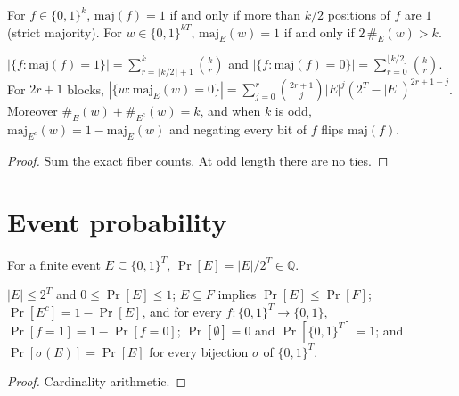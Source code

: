 \begin{definition}[Majority]
  \label{def:encodings-majority}
  \leanok
  For $f \in \{0,1\}^k$, $\mathrm{maj}(f) = 1$ if and only if more than $k/2$
  positions of $f$ are $1$ (strict majority). For $w \in \{0,1\}^{kT}$,
  $\mathrm{maj}_E(w) = 1$ if and only if $2\,\#_E(w) > k$.
\end{definition}

\begin{lemma}
  \label{lem:encodings-majority-count}
  \leanok
  $|\{f : \mathrm{maj}(f) = 1\}| = \sum_{r = \lfloor k/2 \rfloor + 1}^{k} \binom{k}{r}$
  and $|\{f : \mathrm{maj}(f) = 0\}| = \sum_{r=0}^{\lfloor k/2 \rfloor} \binom{k}{r}$.
  For $2r + 1$ blocks,
  $|\{w : \mathrm{maj}_E(w) = 0\}| = \sum_{j=0}^{r} \binom{2r+1}{j} |E|^j (2^T - |E|)^{2r+1-j}$.
  Moreover $\#_E(w) + \#_{E^c}(w) = k$, and when $k$ is odd,
  $\mathrm{maj}_{E^c}(w) = 1 - \mathrm{maj}_E(w)$ and negating every bit of
  $f$ flips $\mathrm{maj}(f)$.
\end{lemma}
\begin{proof}
  \leanok
  Sum the exact fiber counts. At odd length there are no ties.
\end{proof}

\section{Event probability}

\begin{definition}
  \label{def:encodings-eventprob}
  \leanok
  For a finite event $E \subseteq \{0,1\}^T$,
  $\Pr[E] = |E| / 2^T \in \mathbb{Q}$.
\end{definition}

\begin{lemma}
  \label{lem:encodings-eventprob-basic}
  \leanok
  $|E| \le 2^T$ and $0 \le \Pr[E] \le 1$; $E \subseteq F$ implies
  $\Pr[E] \le \Pr[F]$; $\Pr[E^c] = 1 - \Pr[E]$, and for every
  $f : \{0,1\}^T \to \{0,1\}$, $\Pr[f = 1] = 1 - \Pr[f = 0]$;
  $\Pr[\emptyset] = 0$ and $\Pr[\{0,1\}^T] = 1$; and $\Pr[\sigma(E)] = \Pr[E]$
  for every bijection $\sigma$ of $\{0,1\}^T$.
\end{lemma}
\begin{proof}
  \leanok
  Cardinality arithmetic.
\end{proof}

